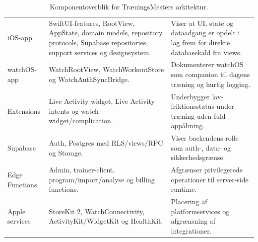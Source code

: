 \begin{table}[htbp]
\small
\renewcommand{\arraystretch}{1.15}
\begin{tabularx}{\textwidth}{>{\RaggedRight\arraybackslash}p{} >{\RaggedRight\arraybackslash}p{} Y}
\toprule
{} &  &  \\
\midrule
iOS-app & SwiftUI-features, RootView, AppState, domain models, repository protocols, Supabase repositories, support services og designsystem. & Viser at UI, state og dataadgang er opdelt i lag frem for direkte databasekald fra views. \\
watchOS-app & WatchRootView, WatchWorkoutStore og WatchAuthSyncBridge. & Dokumenterer watchOS som companion til dagens træning og hurtig logging. \\
Extensions & Live Activity widget, Live Activity intents og watch widget/complication. & Underbygger lav-friktionsstatus under træning uden fuld appåbning. \\
Supabase & Auth, Postgres med RLS/views/RPC og Storage. & Viser backendens rolle som auth-, data- og sikkerhedsgrænse. \\
Edge Functions & Admin, trainer-client, program/import/analyse og billing functions. & Afgrænser privilegerede operationer til server-side runtime. \\
Apple services & StoreKit 2, WatchConnectivity, ActivityKit/WidgetKit og HealthKit. & Placering af platformservices og afgrænsning af integrationer. \\
\bottomrule
\end{tabularx}
\caption{Komponentoverblik for TræningsMesters arkitektur.}
\label{tab:tm-container-architecture}
\end{table}

